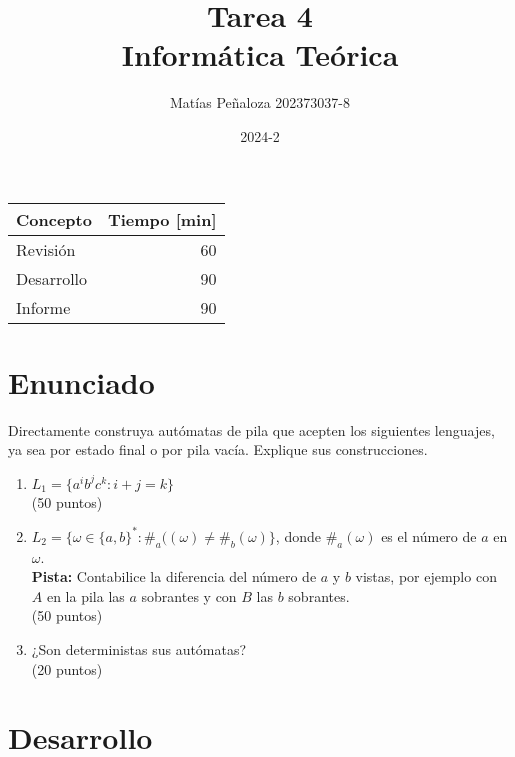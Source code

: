 \documentclass[spanish]{article}
\begin{document}
\title{
    Tarea 4 \\
    Informática Teórica
}
\author{
    Matías Peñaloza
    202373037-8
}
\date{
    2024-2
}
\maketitle

\begin{center}
  \begin{tabular}{|l|r|}
    \hline
    \multicolumn{1}{|c|}{\textbf{Concepto}} &
      \multicolumn{1}{c|}{\textbf{Tiempo [min]}} \\
    \hline
    Revisión & 60\\
    \hline
    Desarrollo    & 90\\
    \hline
    Informe	      & 90\\
    \hline
  \end{tabular}
\end{center}

\section{Enunciado}
Directamente construya autómatas de pila
  que acepten los siguientes lenguajes,
  ya sea por estado final o por pila vacía.
  Explique sus construcciones.
  \begin{enumerate}
  \item %
    \(L_1 = \{a^i b^j c^k \colon i + j = k\}\)
    \\ \hspace*{\fill}(50 puntos)
  \item %
    \(L_2 = \{\omega \in \{a, b\}^* \colon \#_a((\omega) \ne \#_b(\omega)\}\),
    donde \(\#_a(\omega)\) es el número de \(a\) en \(\omega\).
    \\ \textbf{Pista:}
    Contabilice la diferencia del número de \(a\) y \(b\) vistas,
    por ejemplo con \(A\) en la pila las \(a\) sobrantes
    y con \(B\) las \(b\) sobrantes.
    \\ \hspace*{\fill}(50 puntos)
  \item %
    ¿Son deterministas sus autómatas?
    \\ \hspace*{\fill}(20 puntos)
  \end{enumerate}

\section{Desarrollo}
\end{document}
